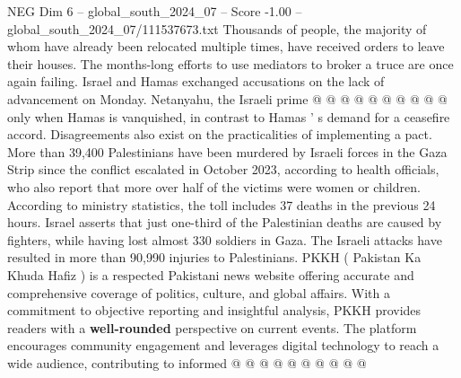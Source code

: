 \begin{textsample}{NEG Dim 6 – global\_south\_2024\_07 – Score -1.00 – global\_south\_2024\_07/111537673.txt}
Thousands of people, the majority of whom have already been relocated multiple times, have received orders to leave their houses.
The months-long efforts to use mediators to broker a truce are once again failing.
Israel and Hamas exchanged accusations on the lack of advancement on Monday.
Netanyahu, the Israeli prime @ @ @ @ @ @ @ @ @ @ only when Hamas is vanquished, in contrast to Hamas ' s demand for a ceasefire accord.
Disagreements also exist on the practicalities of implementing a pact.
More than 39,400 Palestinians have been murdered by Israeli forces in the Gaza Strip since the conflict escalated in October 2023, according to health officials, who also report that more over half of the victims were women or children.
According to ministry statistics, the toll includes 37 deaths in the previous 24 hours.
Israel asserts that just one-third of the Palestinian deaths are caused by fighters, while having lost almost 330 soldiers in Gaza.
The Israeli attacks have resulted in more than 90,990 injuries to Palestinians.
PKKH ( Pakistan Ka Khuda Hafiz ) is a respected Pakistani news website offering accurate and comprehensive coverage of politics, culture, and global affairs.
With a commitment to objective reporting and insightful analysis, PKKH provides readers with a \textbf{well-rounded} perspective on current events.
The platform encourages community engagement and leverages digital technology to reach a wide audience, contributing to informed @ @ @ @ @ @ @ @ @ @

\end{textsample}

